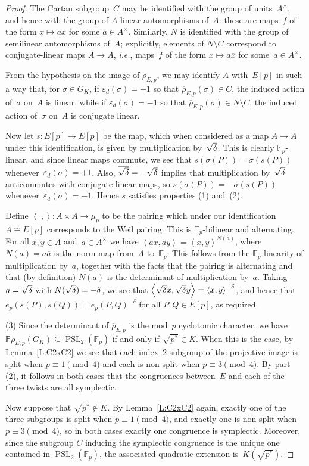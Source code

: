 \documentclass[12pt, reqno]{amsart}
\newcommand{\F}{\mathbb{F}}
\newcommand{\PP}{\mathbb{P}}
\newcommand{\rhobar}{{\overline{\rho}}}
\newcommand{\eps}{\varepsilon}
\newcommand{\PSL}{\operatorname{PSL}}
\numberwithin{equation}{section}
\theoremstyle{definition}
\theoremstyle{remark}
\begin{document}
\begin{proof}
The Cartan subgroup~$C$ may be identified with the group of
units~$A^{\times}$, and hence with the group of $A$-linear
automorphisms of~$A$: these are maps~$f$ of the form $x\mapsto ax$ for
some $a\in A^{\times}$.  Similarly, $N$ is identified with the group
of semilinear automorphisms of~$A$; explicitly, elements of
$N\setminus C$ correspond to conjugate-linear maps $A\to A$,
\textit{i.e.}, maps~$f$ of the form $x\mapsto a\overline{x}$ for
some~$a\in A^{\times}$.

From the hypothesis on the image of $\rhobar_{E,p}$, we may identify
$A$ with~$E[p]$ in such a way that, for $\sigma\in G_K$, if
$\eps_d(\sigma)=+1$ so that $\rhobar_{E,p}(\sigma)\in C$, the induced
action of~$\sigma$ on~$A$ is linear, while if $\eps_d(\sigma)=-1$ so
that $\rhobar_{E,p}(\sigma)\in N\setminus C$, the induced action
of~$\sigma$ on~$A$ is conjugate linear.

Now let $s:E[p]\to E[p]$ be the map, which when considered as a map
$A\to A$ under this identification, is given by multiplication
by~$\sqrt{\delta}$.  This is clearly $\F_p$-linear, and since linear maps
commute, we see that $s(\sigma(P))=\sigma(s(P))$
whenever~$\eps_d(\sigma)=+1$. Also, $\overline{\sqrt{\delta}}=-\sqrt{\delta}$ implies that
multiplication by~$\sqrt{\delta}$ anticommutes with conjugate-linear maps, so
$s(\sigma(P))=-\sigma(s(P))$ whenever~$\eps_d(\sigma)=-1$.  Hence $s$
satisfies properties (1) and~(2).

Define $\left<\; , \right>:A\times A\to \mu_p$ to be the pairing which
under our identification $A\cong E[p]$ corresponds to the Weil
pairing.  This is $\F_p$-bilinear and alternating.  For all $x,y\in A$
and~$a\in A^{\times}$ we have $\left<ax,ay\right> =
\left<x,y\right>^{N(a)}$, where $N(a)=a\overline{a}$ is the norm map
from~$A$ to~$\F_p$.  This follows from the $\F_p$-linearity of
multiplication by~$a$, together with the facts that the pairing is
alternating and that (by definition) $N(a)$ is the determinant of
multiplication by~$a$.  Taking $a=\sqrt{\delta}$ with $N(\sqrt{\delta})=-\delta$, we see
that $\left<\sqrt{\delta} x,\sqrt{\delta} y\right> = \left<x,y\right>^{-\delta}$, and
hence that $e_p(s(P),s(Q)) = e_p(P,Q)^{-\delta}$ for all $P,Q\in
E[p]$, as required.


(3) Since the determinant of $\rhobar_{E,p}$ is the mod~$p$ cyclotomic
character, we have $\PP\rhobar_{E,p}(G_K)\subseteq \PSL_2(\F_p)$ if
and only if $\sqrt{p^*}\in K$.  When this is the case, by
Lemma~\ref{L:C2xC2} we see that each index~$2$ subgroup of the
projective image is split when $p\equiv1\pmod4$ and each is non-split
when $p\equiv3\pmod4$.  By part (2), it follows in both cases that the
congruences between~$E$ and each of the three twists are all
symplectic.

Now suppose that $\sqrt{p^*}\notin K$.  By Lemma~\ref{L:C2xC2} again,
exactly one of the three subgroups is split when $p\equiv1\pmod4$, and
exactly one is non-split when $p\equiv3\pmod4$, so in both cases
exactly one congruence is symplectic.  Moreover, since the subgroup
$C$ inducing the symplectic congruence is the unique one contained in
$\PSL_2(\F_p)$, the associated quadratic extension is~$K(\sqrt{p^*})$.
\end{proof}
\end{document}
